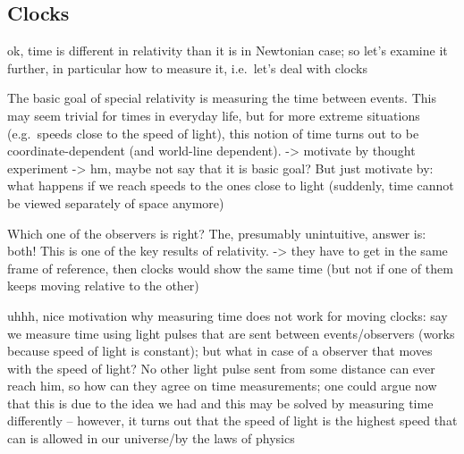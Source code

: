 		\subsection{Clocks}
ok, time is different in relativity than it is in Newtonian case; so let's examine it further, in particular how to measure it, i.e.~let's deal with clocks


The basic goal of special relativity is measuring the time between events. This may seem trivial for times in everyday life, but for more extreme situations (e.g.~speeds close to the speed of light), this notion of time turns out to be coordinate-dependent (and world-line dependent). -> motivate by thought experiment
-> hm, maybe not say that it is basic goal? But just motivate by: what happens if we reach speeds to the ones close to light (suddenly, time cannot be viewed separately of space anymore)


Which one of the observers is right? The, presumably unintuitive, answer is: both! This is one of the key results of relativity. -> they have to get in the same frame of reference, then clocks would show the same time (but not if one of them keeps moving relative to the other)



uhhh, nice motivation why measuring time does not work for moving clocks: say we measure time using light pulses that are sent between events/observers (works because speed of light is constant); but what in case of a observer that moves with the speed of light? No other light pulse sent from some distance can ever reach him, so how can they agree on time measurements; one could argue now that this is due to the idea we had and this may be solved by measuring time differently -- however, it turns out that the speed of light is the highest speed that can is allowed in our universe/by the laws of physics

